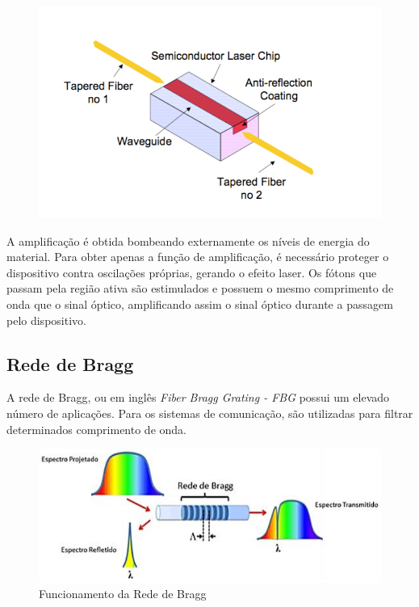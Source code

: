 \documentclass[article]{IEEEtran}
\begin{document}
\begin{figure}[h]
\includegraphics[width=\columnwidth]{soa.jpg}
\end{figure}

A amplificação é obtida bombeando externamente os níveis de energia do material. Para obter apenas a função de amplificação, é necessário proteger o dispositivo contra oscilações próprias, gerando o efeito laser.
Os fótons que passam pela região ativa são estimulados e possuem o mesmo comprimento de onda que o sinal óptico, amplificando assim o sinal óptico durante a passagem pelo dispositivo.


\subsection{Rede de Bragg}
A rede de Bragg, ou em inglês \textit{Fiber Bragg Grating - FBG} possui um elevado número de aplicações. Para os sistemas de comunicação, são utilizadas para filtrar determinados comprimento de onda.

\begin{figure}[h]
\includegraphics[width=\columnwidth]{fbg-principle.png}
\caption{Funcionamento da Rede de Bragg}
\end{figure}
\end{document}
